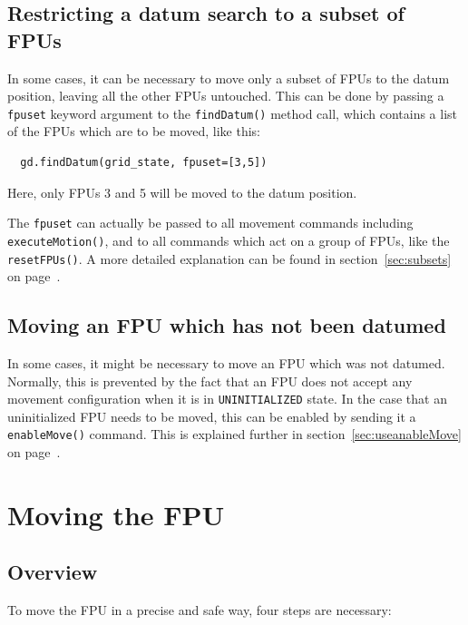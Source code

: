 \documentclass[fontsize=12,a4paper]{scrreprt}
\begin{document}
\subsection{Restricting a datum search to a subset of FPUs}
\label{sec:restricteddatumsearch}
  
In some cases, it can be necessary to move only a subset of FPUs to
the datum position, leaving all the other FPUs untouched. This can be
done by passing a \texttt{fpuset} keyword argument to the
\texttt{findDatum()} method call, which contains a list of the FPUs
which are to be moved, like this:
\begin{verbatim}
  gd.findDatum(grid_state, fpuset=[3,5])
\end{verbatim}
Here, only FPUs 3 and 5 will be moved to the datum position.

The \texttt{fpuset} can actually be passed to all movement commands
including \texttt{executeMotion()}, and to all commands which act on a
group of FPUs, like the \texttt{resetFPUs()}. A more detailed
explanation can be found in section~\ref{sec:subsets} on
page~\pageref{sec:subsets}.

\subsection{Moving an FPU which has not been datumed}
%
%
In some cases, it might be necessary to move an FPU which was not
datumed. Normally, this is prevented by the fact that an FPU does not
accept any movement configuration when it is in \texttt{UNINITIALIZED}
state. In the case that an uninitialized FPU needs to be moved, this
can be enabled by sending it a \texttt{enableMove()} command. This is
explained further in section~\ref{sec:useanableMove} on
page~\pageref{sec:useanableMove}.



\section{Moving the FPU}
\subsection{Overview}
To move the FPU in a precise and safe way, four steps are necessary:
\end{document}
